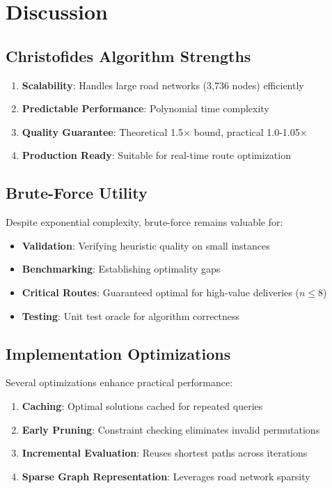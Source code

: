 \documentclass[9pt,a4paper,twoside]{tau}
\begin{document}

\section{Discussion}

\subsection{Christofides Algorithm Strengths}

\begin{enumerate}
    \item \textbf{Scalability}: Handles large road networks (3,736 nodes) efficiently
    \item \textbf{Predictable Performance}: Polynomial time complexity
    \item \textbf{Quality Guarantee}: Theoretical 1.5$\times$ bound, practical 1.0-1.05$\times$
    \item \textbf{Production Ready}: Suitable for real-time route optimization
\end{enumerate}

\subsection{Brute-Force Utility}

Despite exponential complexity, brute-force remains valuable for:
\begin{itemize}
    \item \textbf{Validation}: Verifying heuristic quality on small instances
    \item \textbf{Benchmarking}: Establishing optimality gaps
    \item \textbf{Critical Routes}: Guaranteed optimal for high-value deliveries ($n \leq 8$)
    \item \textbf{Testing}: Unit test oracle for algorithm correctness
\end{itemize}

\subsection{Implementation Optimizations}

Several optimizations enhance practical performance:

\begin{enumerate}
    \item \textbf{Caching}: Optimal solutions cached for repeated queries
    \item \textbf{Early Pruning}: Constraint checking eliminates invalid permutations
    \item \textbf{Incremental Evaluation}: Reuses shortest paths across iterations
    \item \textbf{Sparse Graph Representation}: Leverages road network sparsity
\end{enumerate}
\end{document}
